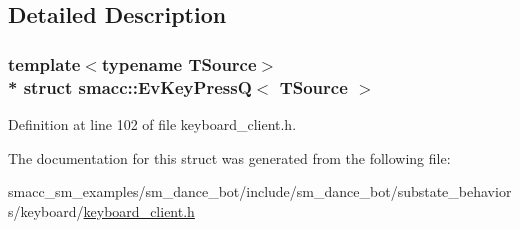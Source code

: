 \subsection{Detailed Description}
\subsubsection*{template$<$typename T\+Source$>$\\*
struct smacc\+::\+Ev\+Key\+Press\+Q$<$ T\+Source $>$}



Definition at line 102 of file keyboard\+\_\+client.\+h.



The documentation for this struct was generated from the following file\+:\begin{DoxyCompactItemize}
\item 
smacc\+\_\+sm\+\_\+examples/sm\+\_\+dance\+\_\+bot/include/sm\+\_\+dance\+\_\+bot/substate\+\_\+behaviors/keyboard/\hyperlink{keyboard__client_8h}{keyboard\+\_\+client.\+h}\end{DoxyCompactItemize}
